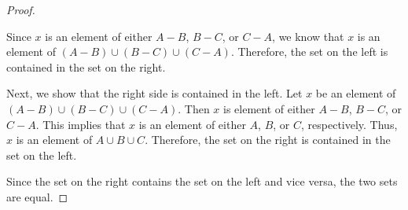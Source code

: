 \documentclass[twoside,12pt]{article}
\begin{document}
{\begin{proof}
\begin{itemize}
\end{itemize}

\noindent Since $x$ is an element of either $A - B$, $B - C$, or $C -
A$, we know that $x$ is an element of $(A - B) \cup (B - C) \cup (C -
A)$.  Therefore, the set on the left is contained in the set on the
right.

Next, we show that the right side is contained in the left.  Let $x$
be an element of $(A - B) \cup (B - C) \cup (C - A)$.  Then $x$ is
element of either $A - B$, $B - C$, or $C - A$.  This implies that $x$
is an element of either $A$, $B$, or $C$, respectively.  Thus, $x$ is
an element of $A \cup B \cup C$.  Therefore, the set on the right is
contained in the set on the left.

Since the set on the right contains the set on the left and
vice versa, the two sets are equal.
\end{proof}
}

\end{document}
